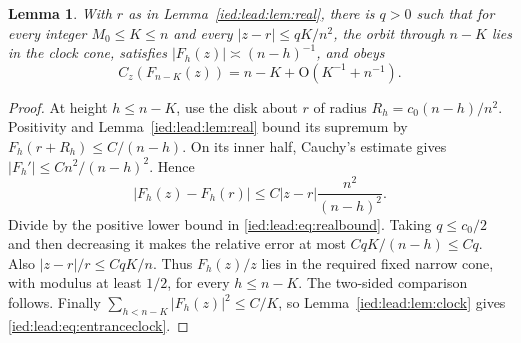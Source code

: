 \documentclass[11pt,letterpaper]{article}
\newtheorem{lemma}[theorem]{Lemma}
\theoremstyle{remark}\newtheorem{remark}[theorem]{Remark}
\newcommand{\Oh}{\mathrm O}\newcommand{\supp}{\operatorname{supp}}
\begin{document}
\begin{lemma}\label{ied:lead:lem:entrance}
With $r$ as in Lemma~\ref{ied:lead:lem:real}, there is $q>0$ such that for every integer $M_0\le K\le n$ and every $|z-r|\le qK/n^2$, the orbit through $n-K$ lies in the clock cone, satisfies $|F_h(z)|\asymp(n-h)^{-1}$, and obeys
\begin{equation}\label{ied:lead:eq:entranceclock}
 C_z(F_{n-K}(z))=n-K+\Oh(K^{-1}+n^{-1}).
\end{equation}
\end{lemma}
\begin{proof}
At height $h\le n-K$, use the disk about $r$ of radius
$R_h=c_0(n-h)/n^2$. Positivity and Lemma~\ref{ied:lead:lem:real} bound its supremum by $F_h(r+R_h)\le C/(n-h)$. On its inner half, Cauchy's estimate gives
$|F_h'|\le Cn^2/(n-h)^2$. Hence
\[
 |F_h(z)-F_h(r)|\le C|z-r|\frac{n^2}{(n-h)^2}.
\]
Divide by the positive lower bound in \eqref{ied:lead:eq:realbound}. Taking $q\le c_0/2$ and then decreasing it makes the relative error at most $CqK/(n-h)\le Cq$. Also $|z-r|/r\le CqK/n$. Thus $F_h(z)/z$ lies in the required fixed narrow cone, with modulus at least $1/2$, for every $h\le n-K$. The two-sided comparison follows. Finally
$\sum_{h<n-K}|F_h(z)|^2\le C/K$, so Lemma~\ref{ied:lead:lem:clock} gives \eqref{ied:lead:eq:entranceclock}.
\end{proof}
\end{document}
